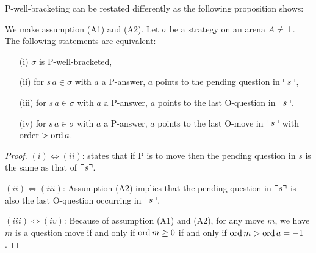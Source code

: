 P-well-bracketing can be restated differently as the following proposition shows:
\begin{proposition}
\label{prop:char_wellbrack}
\rm We make assumption (A1) and (A2).
Let $\sigma$ be a strategy on an arena $A\neq \bot$.
The following statements are equivalent:
\begin{enumerate}
\item[(i)] $\sigma$ is P-well-bracketed,
\item[(ii)] for $s \, a \in \sigma$ with $a$ a P-answer, $a$ points to the pending question in $\ulcorner s \urcorner$,
\item[(iii)] for $s \, a \in \sigma$ with $a$ a P-answer, $a$ points to the last O-question in $\ulcorner s \urcorner$.
\item[(iv)] for $s \, a \in \sigma$ with $a$ a P-answer, $a$ points to the last O-move in $\ulcorner s \urcorner$ with order $>\mathop{\mathrm{ord}}{a}$.
\end{enumerate}
\end{proposition}
\begin{proof}
$(i)\iff(ii)$: \cite[Lemma 2.1]{McC96b} states that if P is to move then the pending question in $s$ is the same as that of $\ulcorner s \urcorner$.

$(ii)\iff(iii)$: Assumption (A2) implies that the pending question in $\ulcorner s \urcorner$ is also the last O-question occurring in $\ulcorner s \urcorner$.

$(iii)\iff(iv)$: Because of assumption (A1) and (A2),
for any move $m$, we have $m$ is a question move
if and only if $\mathop{\mathrm{ord}}{m} \geq 0$ if and only if $\mathop{\mathrm{ord}}{m} > \mathop{\mathrm{ord}}{a} = -1$.
\end{proof}




